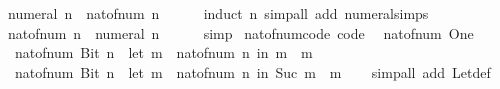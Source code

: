 \begin{isabellebody}
\ {\isachardoublequoteopen}numeral\ n\ {\isacharequal}{\kern0pt}\ nat{\isacharunderscore}{\kern0pt}of{\isacharunderscore}{\kern0pt}num\ n{\isachardoublequoteclose}\isanewline
\ \ \ \ \isamarkupfalse%
\ {\isacharparenleft}{\kern0pt}induct\ n{\isacharparenright}{\kern0pt}\ {\isacharparenleft}{\kern0pt}simp{\isacharunderscore}{\kern0pt}all\ add{\isacharcolon}{\kern0pt}\ numeral{\isachardot}{\kern0pt}simps{\isacharparenright}{\kern0pt}\isanewline
\ \ \isamarkupfalse%
\ \isamarkupfalse%
\ {\isachardoublequoteopen}nat{\isacharunderscore}{\kern0pt}of{\isacharunderscore}{\kern0pt}num\ n\ {\isacharequal}{\kern0pt}\ numeral\ n{\isachardoublequoteclose}\isanewline
\ \ \ \ \isamarkupfalse%
\ simp\isanewline
{}\isamarkupfalse%
%
\endisatagproof
{\isafoldproof}%
%
\isadelimproof
\isanewline
%
\endisadelimproof
\isanewline
{}\isamarkupfalse%
\ nat{\isacharunderscore}{\kern0pt}of{\isacharunderscore}{\kern0pt}num{\isacharunderscore}{\kern0pt}code\ {\isacharbrackleft}{\kern0pt}code{\isacharbrackright}{\kern0pt}{\isacharcolon}{\kern0pt}\isanewline
\ \ {\isachardoublequoteopen}nat{\isacharunderscore}{\kern0pt}of{\isacharunderscore}{\kern0pt}num\ One\ {\isacharequal}{\kern0pt}\ {}{\isachardoublequoteclose}\isanewline
\ \ {\isachardoublequoteopen}nat{\isacharunderscore}{\kern0pt}of{\isacharunderscore}{\kern0pt}num\ {\isacharparenleft}{\kern0pt}Bit{}\ n{\isacharparenright}{\kern0pt}\ {\isacharequal}{\kern0pt}\ {\isacharparenleft}{\kern0pt}let\ m\ {\isacharequal}{\kern0pt}\ nat{\isacharunderscore}{\kern0pt}of{\isacharunderscore}{\kern0pt}num\ n\ in\ m\ {\isacharplus}{\kern0pt}\ m{\isacharparenright}{\kern0pt}{\isachardoublequoteclose}\isanewline
\ \ {\isachardoublequoteopen}nat{\isacharunderscore}{\kern0pt}of{\isacharunderscore}{\kern0pt}num\ {\isacharparenleft}{\kern0pt}Bit{}\ n{\isacharparenright}{\kern0pt}\ {\isacharequal}{\kern0pt}\ {\isacharparenleft}{\kern0pt}let\ m\ {\isacharequal}{\kern0pt}\ nat{\isacharunderscore}{\kern0pt}of{\isacharunderscore}{\kern0pt}num\ n\ in\ Suc\ {\isacharparenleft}{\kern0pt}m\ {\isacharplus}{\kern0pt}\ m{\isacharparenright}{\kern0pt}{\isacharparenright}{\kern0pt}{\isachardoublequoteclose}\isanewline
%
\isadelimproof
\ \ %
\endisadelimproof
%
\isatagproof
{}\isamarkupfalse%
\ {\isacharparenleft}{\kern0pt}simp{\isacharunderscore}{\kern0pt}all\ add{\isacharcolon}{\kern0pt}\ Let{\isacharunderscore}{\kern0pt}def{\isacharparenright}{\kern0pt}%
\endisatagproof
{\isafoldproof}%
%
\isadelimproof
%
\endisadelimproof

\end{isabellebody}

